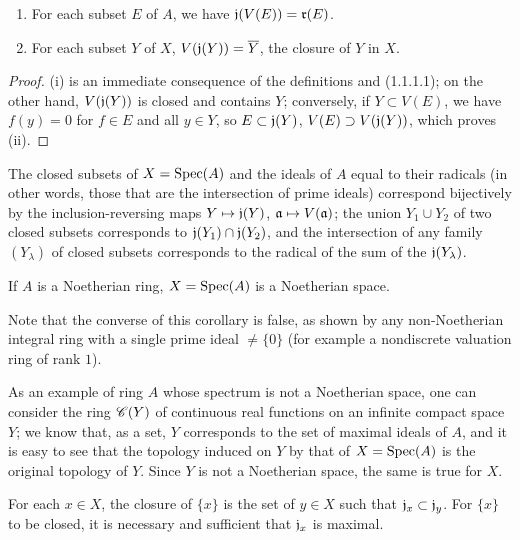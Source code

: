 \begin{prop}[1.1.4]
\label{1.1.1.4}
\medskip\noindent
\begin{enumerate}[label=\emph{(\roman*)}]
  \item For each subset $E$ of $A$, we have $\mathfrak{j}(V(E))=\mathfrak{r}(E)$.
  \item For each subset $Y$ of $X$, $V(\mathfrak{j}(Y))=\overline{Y}$, the closure of $Y$ in $X$.
\end{enumerate}
\end{prop}

\begin{proof}
\label{proof-1.1.1.4}
(i) is an immediate consequence of the definitions and (1.1.1.1);
on the other hand, $V(\mathfrak{j}(Y))$ is closed and contains $Y$;
conversely, if $Y\subset V(E)$, we have $f(y)=0$ for $f\in E$ and all $y\in Y$, so $E\subset\mathfrak{j}(Y)$, $V(E)\supset V(\mathfrak{j}(Y))$, which proves (ii).
\end{proof}

\begin{cor}[1.1.5]
\label{1.1.1.5}
The closed subsets of $X={\mathop{\mathrm{Spec}}\nolimits}(A)$ and the ideals of $A$ equal to their radicals (in other words, those that are the intersection of prime ideals) correspond bijectively by the inclusion-reversing maps $Y\mapsto\fk{j}(Y)$, $\fk{a}\mapsto V(\fk{a})$;
the union $Y_1\cup Y_2$ of two closed subsets corresponds to $\mathfrak{j}(Y_1)\cap\mathfrak{j}(Y_2)$, and the intersection of any family $(Y_\lambda)$ of closed subsets corresponds to the radical of the sum of the $\mathfrak{j}(Y_\lambda)$.
\end{cor}

\begin{cor}[1.1.6]
\label{1.1.1.6}
If $A$ is a Noetherian ring, $X={\mathop{\mathrm{Spec}}\nolimits}(A)$ is a Noetherian space.
\end{cor}

Note that the converse of this corollary is false, as shown by any non-Noetherian integral ring with a single prime ideal $\neq\{0\}$ (for example a nondiscrete valuation ring of rank $1$).

As an example of ring $A$ whose spectrum is not a Noetherian space, one can consider the ring $\mathscr{C}(Y)$ of continuous real functions on an infinite compact space $Y$;
we know that, as a set, $Y$ corresponds to the set of maximal ideals of $A$, and it is easy to see that the topology induced on $Y$ by that of $X={\mathop{\mathrm{Spec}}\nolimits}(A)$ is the original topology of $Y$.
Since $Y$ is not a Noetherian space, the same is true for $X$.

\begin{cor}[1.1.7]
\label{1.1.1.7}
For each $x\in X$, the closure of $\{x\}$ is the set of $y\in X$ such that $\mathfrak{j}_x\subset\mathfrak{j}_y$.
For $\{x\}$ to be closed, it is necessary and sufficient that $\mathfrak{j}_x$ is maximal.
\end{cor}

